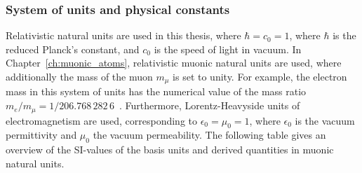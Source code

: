 \subsubsection*{System of units and physical constants}
Relativistic natural units are used in this thesis, where $\hbar=c_0=1$, where $\hbar$ is the reduced Planck's constant, and $c_0$ is the speed of light in vacuum. In Chapter~\ref{ch:muonic_atoms}, relativistic muonic natural units are used, where additionally the mass of the muon $m_\mu$ is set to unity. For example, the electron mass in this system of units has the numerical value of the mass ratio $m_e/m_\mu = 1/206.768\,282\,6$~\cite{codata}.
Furthermore, Lorentz-Heavyside units of electromagnetism are used, corresponding to $\epsilon_0=\mu_0=1$, where $\epsilon_0$ is the vacuum permittivity and $\mu_0$ the vacuum permeability.
The following table gives an overview of the SI-values of the basis units and derived quantities in muonic natural units.\\%
%
